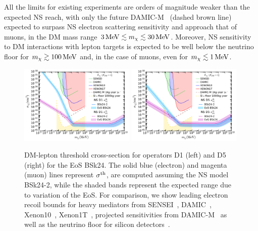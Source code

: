     
All the limits for existing experiments are orders of magnitude weaker than the expected NS reach, with only the future DAMIC-M~\cite{Essig:2015cda_DirectdetectionsubGeV} (dashed brown line) expected to surpass NS electron scattering sensitivity and approach that of muons, in the DM mass range  $3{\rm \,MeV}\lesssim m_\chi\lesssim 30{\rm \,MeV}$. Moreover, NS sensitivity to DM interactions with lepton targets is expected to be well below the neutrino floor for $m_\chi\gtrsim 100{\rm \,MeV}$ and, in the case of muons, even for $m_\chi\lesssim 1{\rm \,MeV}$. 

\begin{figure}[t!bp]
    \centering
    \includegraphics[width=0.49\textwidth]{capture_2/DD_NS_leptons.pdf}
    \includegraphics[width=0.49\textwidth]{capture_2/DD_NS_leptons_D5.pdf}
    \caption[DM-lepton threshold cross-section for operators D1 (left) and D5 (right) for the EoS BSk24.]{DM-lepton threshold cross-section for operators D1 (left) and D5 (right) for the EoS BSk24. The solid blue (electron) and magenta (muon) lines represent $\sigma^{\rm th}$, are computed assuming the NS model BSk24-2, while the shaded bands represent the expected range due to variation of the EoS. For comparison, we show leading electron recoil bounds for heavy mediators from SENSEI~\cite{SENSEI:2020dpa_SENSEIDirectdetectionresults}, DAMIC~\cite{DAMIC:2019dcn_Constraintslightdark}, Xenon10~\cite{Essig:2017kqs_Newconstraintsprospects}, Xenon1T~\cite{XENON:2019gfn_Lightdarkmatter}, projected sensitivities from DAMIC-M~\cite{Essig:2015cda_DirectdetectionsubGeV} as well as the neutrino floor for silicon detectors~\cite{Essig:2018tss_Solarneutrinossignal}.}
        \label{ch4:fig:sigmathe}
\end{figure}

